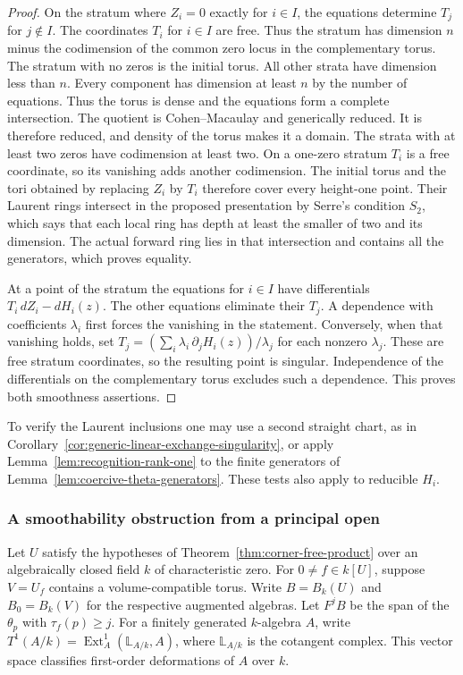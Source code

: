 \documentclass[11pt,reqno]{amsart}
\numberwithin{equation}{section}
\theoremstyle{definition}
\theoremstyle{remark}
\begin{document}
\begin{proof}
On the stratum where \(Z_i=0\) exactly for \(i\in I\), the equations
determine \(T_j\) for \(j\notin I\). The coordinates \(T_i\) for
\(i\in I\) are free. Thus the stratum has dimension \(n\) minus the
codimension of the common zero locus in the complementary torus. The stratum with no zeros is the
initial torus. All other strata have dimension less than \(n\).
Every component has dimension at least \(n\) by the number of
equations. Thus the torus is dense and the equations form a complete intersection.
The quotient is Cohen--Macaulay and generically reduced. It is therefore
reduced, and density of the torus makes it a domain. The strata with at least two zeros have
codimension at least two. On a one-zero stratum \(T_i\) is a free
coordinate, so its vanishing adds another codimension. The initial
torus and the tori obtained by replacing \(Z_i\) by \(T_i\) therefore
cover every height-one point. Their Laurent rings intersect in the
proposed presentation by Serre's condition \(S_2\), which says that each
local ring has depth at least the smaller of two and its dimension. The actual forward
ring lies in that intersection and contains all the generators,
which proves equality.

At a point of the stratum the equations for \(i\in I\) have
differentials \(T_i\,dZ_i-dH_i(z)\). The other equations eliminate
their \(T_j\). A dependence with coefficients \(\lambda_i\) first
forces the vanishing in the statement. Conversely, when that
vanishing holds, set \(T_j=(\sum_i\lambda_i\,\partial_jH_i(z))/
\lambda_j\) for each nonzero \(\lambda_j\). These are free stratum
coordinates, so the resulting point is singular. Independence of
the differentials on the complementary torus excludes such a
dependence. This proves both smoothness assertions.
\end{proof}

To verify the Laurent inclusions one may use a second straight chart,
as in Corollary~\ref{cor:generic-linear-exchange-singularity}, or apply
Lemma~\ref{lem:recognition-rank-one} to the finite generators of
Lemma~\ref{lem:coercive-theta-generators}. These tests also apply to
reducible \(H_i\).

\subsubsection{A smoothability obstruction from a principal open}

Let \(U\) satisfy the hypotheses of Theorem~\ref{thm:corner-free-product}
over an algebraically closed field \(k\) of characteristic zero. For
\(0\ne f\in k[U]\), suppose \(V=U_f\) contains a volume-compatible
torus. Write \(B=B_k(U)\) and \(B_0=B_k(V)\) for the respective augmented
algebras. Let \(F^jB\) be the span of the \(\theta_p\) with
\(\tau_f(p)\ge j\). For a finitely generated \(k\)-algebra \(A\), write
\(T^1(A/k)=\operatorname{Ext}^1_A(\mathbb L_{A/k},A)\), where
\(\mathbb L_{A/k}\) is the cotangent complex. This vector space
classifies first-order deformations of \(A\) over \(k\).
\end{document}
